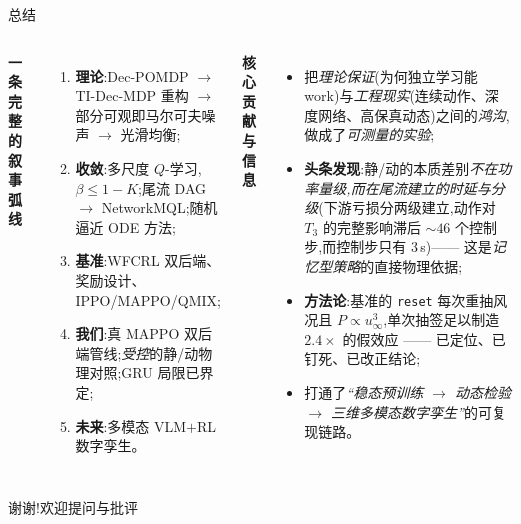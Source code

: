 \documentclass[aspectratio=169,11pt,UTF8]{ctexbeamer}
\newcommand{\wind}{u_{\infty}}
\newcommand{\emphb}[1]{\textcolor{myred}{\textbf{#1}}}
\newcommand{\emphg}[1]{\textcolor{mygreen}{\textbf{#1}}}
\begin{document}
\begin{frame}{总结}
\small
\begin{columns}[T]
\textbf{一条完整的叙事弧线}
\begin{enumerate}\setlength\itemsep{2pt}
  \item \emphb{理论}:Dec-POMDP $\to$ TI-Dec-MDP 重构 $\to$ 部分可观即马尔可夫噪声 $\to$ 光滑均衡;
  \item \emphb{收敛}:多尺度 $Q$-学习,$\beta\le1-K$;尾流 DAG $\to$ NetworkMQL;随机逼近 ODE 方法;
  \item \emphb{基准}:WFCRL 双后端、奖励设计、IPPO/MAPPO/QMIX;
  \item \emphg{我们}:真 MAPPO 双后端管线;\emph{受控}的静/动物理对照;GRU 局限已界定;
  \item \emphg{未来}:多模态 VLM$+$RL 数字孪生。
\end{enumerate}
\textbf{核心贡献与信息}
\begin{itemize}\setlength\itemsep{3pt}
  \item 把\emph{理论保证}(为何独立学习能work)与\emph{工程现实}(连续动作、深度网络、高保真动态)之间的\emph{鸿沟},做成了\emph{可测量的实验};
  \item \emphb{头条发现}:静/动的本质差别\emph{不在功率量级,而在尾流建立的时延与分级}(下游亏损分两级建立,动作对 $T_3$ 的完整影响滞后 $\sim\!46$ 个控制步,而控制步只有 $3$\,s)—— 这是\emph{记忆型策略}的直接物理依据;
  \item \emphb{方法论}:基准的 \texttt{reset} 每次重抽风况且 $P\!\propto\!\wind^3$,单次抽签足以制造 $2.4\times$ 的假效应 —— 已定位、已钉死、已改正结论;
  \item 打通了\emph{“稳态预训练 $\to$ 动态检验 $\to$ 三维多模态数字孪生”}的可复现链路。
\end{itemize}
\end{columns}
\vspace{2mm}
\centering
{\color{myblue}\Large 谢谢!\quad\normalsize 欢迎提问与批评}
\end{frame}
\end{document}
